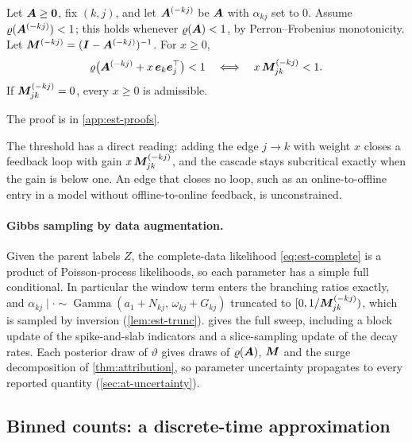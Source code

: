 \begin{lemma}\label{lem:est-trunc}
Let $\bm{A}\ge\mathbf{0}$, fix $(k,j)$, and let $\bm{A}^{(-kj)}$ be $\bm{A}$ with $\alpha_{kj}$ set
to $0$. Assume $\varrho(\bm{A}^{(-kj)})<1$; this holds whenever $\varrho(\bm{A})<1$, by
Perron--Frobenius monotonicity. Let $\bm{M}^{(-kj)}=(\bm{I}-\bm{A}^{(-kj)})^{-1}$. For
$x\ge0$,
\[
  \varrho\big(\bm{A}^{(-kj)}+x\,\bm e_k\bm e_j^{\top}\big)<1
  \quad\Longleftrightarrow\quad
  x\,\bm{M}^{(-kj)}_{jk}<1 .
\]
If $\bm{M}^{(-kj)}_{jk}=0$, every $x\ge0$ is admissible.
\end{lemma}

The proof is in \cref{app:est-proofs}.

The threshold has a direct reading: adding the edge $j\to k$ with weight $x$ closes a
feedback loop with gain $x\,\bm{M}^{(-kj)}_{jk}$, and the cascade stays subcritical exactly
when the gain is below one. An edge that closes no loop, such as an online-to-offline entry
in a model without offline-to-online feedback, is unconstrained.

\paragraph{Gibbs sampling by data augmentation.} Given the parent labels $Z$, the
complete-data likelihood \eqref{eq:est-complete} is a product of Poisson-process
likelihoods, so each parameter has a simple full conditional. In particular the window
term enters the branching ratios exactly, and
$\alpha_{kj}\mid\cdot\sim\operatorname{Gamma}(a_1+N_{kj},\,\omega_{kj}+G_{kj})$ truncated to
$[0,1/\bm{M}^{(-kj)}_{jk})$, which is sampled by inversion (\cref{lem:est-trunc}).
 gives the full sweep, including a block update of the spike-and-slab
indicators and a slice-sampling update of the decay rates. Each posterior draw of
$\vartheta$ gives draws of $\varrho(\bm{A})$, $\bm{M}$ and the surge decomposition of
\cref{thm:attribution}, so parameter uncertainty propagates to every reported quantity
(\cref{sec:at-uncertainty}).

\subsection{Binned counts: a discrete-time approximation}\label{sec:est-inar}

